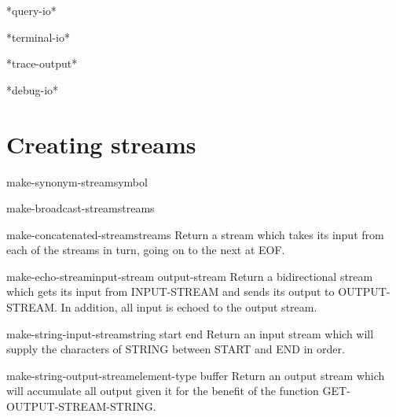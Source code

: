 \documentclass[10pt,english]{book}
\begin{document}
\begin{variable}{*query-io*}{}
  
\end{variable}

\begin{variable}{*terminal-io*}{}
  
\end{variable}

\begin{variable}{*trace-output*}{}
  
\end{variable}

\begin{variable}{*debug-io*}{}
  
\end{variable}

\section{Creating streams}
\label{sec:creating-streams}

\begin{function}{make-synonym-stream}{symbol}
  
\end{function}

\begin{function}{make-broadcast-stream}{\rest streams}
  
\end{function}

\begin{function}{make-concatenated-stream}{\rest streams}
  Return a stream which takes its input from each of the streams in turn,
   going on to the next at EOF.
\end{function}

\begin{function}{make-echo-stream}{input-stream output-stream}
  Return a bidirectional stream which gets its input from INPUT-STREAM and
   sends its output to OUTPUT-STREAM. In addition, all input is echoed to
   the output stream.
\end{function}

\begin{function}{make-string-input-stream}{string \op start end}
  Return an input stream which will supply the characters of STRING between
  START and END in order.
\end{function}

\begin{function}{make-string-output-stream}{\key element-type \aux buffer}
  Return an output stream which will accumulate all output given it for the
benefit of the function GET-OUTPUT-STREAM-STRING.
\end{function}
\end{document}
